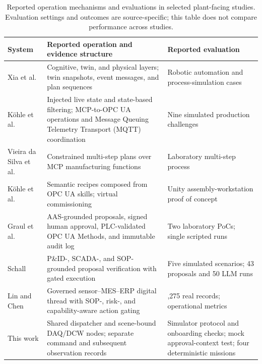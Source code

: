 \begin{table}[!t]
\centering
\caption{Reported operation mechanisms and evaluations in selected
plant-facing studies. Evaluation settings and outcomes are source-specific;
this table does not compare performance across studies.}
\label{tab:nearest}
\small
\setlength{\tabcolsep}{3pt}
\begin{tabularx}{\textwidth}{@{}>{\raggedright\arraybackslash}p{1.8cm}>{\raggedright\arraybackslash}p{7.0cm}>{\raggedright\arraybackslash}X@{}}
\toprule
System & Reported operation and evidence structure & Reported evaluation \\
\midrule
Xia et al. \cite{xia2025architecture} & Cognitive, twin, and physical layers; twin snapshots, event messages, and plan sequences & Robotic automation and process-simulation cases \\
K{\"o}hle et al. \cite{koehle2026llmdriven} & Injected live state and state-based filtering; MCP-to-OPC UA operations and Message Queuing Telemetry Transport (MQTT) coordination & Nine simulated production challenges \\
Vieira da Silva et al. \cite{silva2025mcpmanufacturing} & Constrained multi-step plans over MCP manufacturing functions & Laboratory multi-step process \\
K{\"o}hle et al. \cite{koehle2025semanticrecipes} & Semantic recipes composed from OPC UA skills; virtual commissioning & Unity assembly-workstation proof of concept \\
Graul et al. \cite{graul2026aas} & AAS-grounded proposals, signed human approval, PLC-validated OPC UA Methods, and immutable audit log & Two laboratory PoCs; single scripted runs \\
Schall \cite{schall2026safe} & P\&ID-, SCADA-, and SOP-grounded proposal verification with gated execution & Five simulated scenarios; 43 proposals and 50 LLM runs \\
Lin and Chen \cite{lin2026agentic} & Governed sensor--MES--ERP digital thread with SOP-, risk-, and capability-aware action gating & 25,275 real records; operational metrics \\
\midrule
This work & Shared dispatcher and scene-bound DAQ/DCW nodes; separate command and subsequent observation records & Simulator protocol and onboarding checks; mock approval-context test; four deterministic missions \\
\bottomrule
\end{tabularx}
\end{table}

